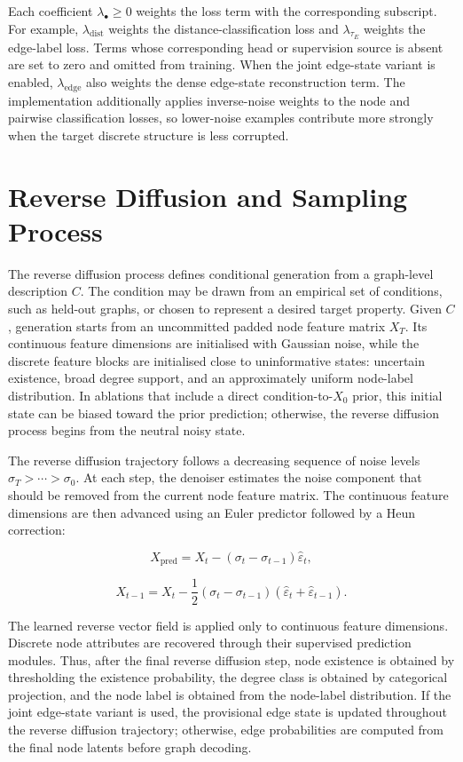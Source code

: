 Each coefficient \(\lambda_{\bullet}\geq 0\) weights the loss term with the
corresponding subscript. For example, \(\lambda_{\mathrm{dist}}\) weights the
distance-classification loss and \(\lambda_{\tau_E}\) weights the edge-label
loss. Terms whose corresponding head or supervision source is absent are set to
zero and omitted from training. When the joint edge-state variant is enabled,
\(\lambda_{\mathrm{edge}}\) also weights the dense edge-state reconstruction
term. The implementation additionally applies inverse-noise weights to the node
and pairwise classification losses, so lower-noise examples contribute more
strongly when the target discrete structure is less corrupted.

\section{Reverse Diffusion and Sampling Process}
\label{sec:generator:sampling}

The reverse diffusion process defines conditional generation from a graph-level
description \(C\). The condition may be drawn from an empirical set of
conditions, such as held-out graphs, or chosen to represent a desired
target property. Given \(C\), generation starts from an uncommitted padded node
feature matrix \(X_T\). Its continuous feature dimensions are initialised with
Gaussian noise, while the discrete feature blocks are initialised close to
uninformative states: uncertain existence, broad degree support, and an
approximately uniform node-label distribution. In ablations that include a
direct condition-to-\(X_0\) prior, this initial state can be biased toward the
prior prediction; otherwise, the reverse diffusion process begins from the
neutral noisy state.

The reverse diffusion trajectory follows a decreasing sequence of noise levels
\(\sigma_T > \cdots > \sigma_0\). At each step, the denoiser estimates the
noise component that should be removed from the current node feature matrix.
The continuous feature dimensions are then advanced using an Euler predictor
followed by a Heun correction:

\[
    X_{\mathrm{pred}}
    =
    X_t - (\sigma_t-\sigma_{t-1})\hat{\varepsilon}_t,
\]

\[
    X_{t-1}
    =
    X_t
    -
    \frac{1}{2}(\sigma_t-\sigma_{t-1})
    (\hat{\varepsilon}_t+\hat{\varepsilon}_{t-1}).
\]

The learned reverse vector field is applied only to continuous feature dimensions.
Discrete node attributes are recovered through their supervised prediction
modules. Thus, after the final reverse diffusion step, node existence is obtained by
thresholding the existence probability, the degree class is obtained by
categorical projection, and the node label is obtained from the node-label
distribution. If the joint edge-state variant is used, the provisional edge
state is updated throughout the reverse diffusion trajectory; otherwise, edge
probabilities are computed from the final node latents before graph decoding.


